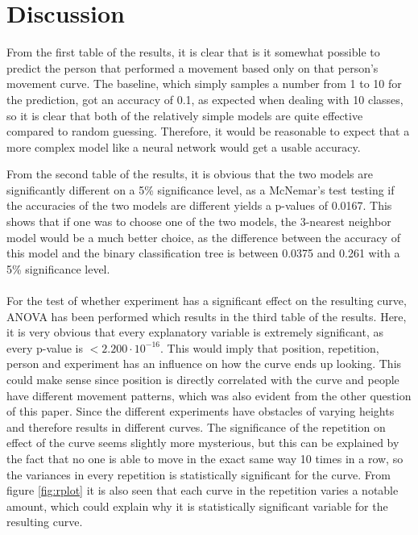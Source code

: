 \documentclass[11pt, fleqn, titlepage]{article}
\begin{document}
\section{Discussion}
From the first table of the results, it is clear that is it somewhat possible to predict the person that performed a movement based only on that person's movement curve. The baseline, which simply samples a number from 1 to 10 for the prediction, got an accuracy of 0.1, as expected when dealing with 10 classes, so it is clear that both of the relatively simple models are quite effective compared to random guessing. Therefore, it would be reasonable to expect that a more complex model like a neural network would get a usable accuracy.

From the second table of the results, it is obvious that the two models are significantly different on a 5\% significance level, as a McNemar's test testing if the accuracies of the two models are different yields a p-values of 0.0167. This shows that if one was to choose one of the two models, the 3-nearest neighbor model would be a much better choice, as the difference between the accuracy of this model and the binary classification tree is between 0.0375 and 0.261 with a 5\% significance level. 
\\\\
For the test of whether experiment has a significant effect on the resulting curve, ANOVA has been performed which results in the third table of the results. Here, it is very obvious that every explanatory variable is extremely significant, as every p-value is $<2.200 \cdot 10^{-16}$. This would imply that position, repetition, person and experiment has an influence on how the curve ends up looking. This could make sense since position is directly correlated with the curve and people have different movement patterns, which was also evident from the other question of this paper. Since the different experiments have obstacles of varying heights and therefore results in different curves. The significance of the repetition on effect of the curve seems slightly more mysterious, but this can be explained by the fact that no one is able to move in the exact same way 10 times in a row, so the variances in every repetition is statistically significant for the curve. From figure \ref{fig:rplot} it is also seen that each curve in the repetition varies a notable amount, which could explain why it is statistically significant variable for the resulting curve. 
\end{document}
